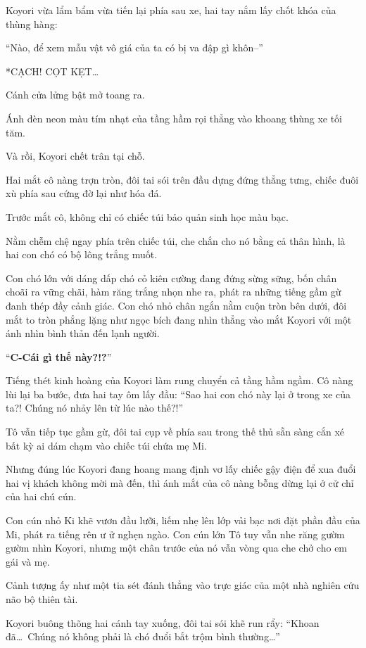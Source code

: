\documentclass[../main.tex]{subfiles}
\begin{document}
Koyori vừa lẩm bẩm vừa tiến lại phía sau xe, hai tay nắm lấy chốt khóa của thùng hàng:

``Nào, để xem mẫu vật vô giá của ta có bị va đập gì khôn--''

*CẠCH! CỌT KẸT\dots*

Cánh cửa lửng bật mở toang ra.

Ánh đèn neon màu tím nhạt của tầng hầm rọi thẳng vào khoang thùng xe tối tăm.

Và rồi, Koyori chết trân tại chỗ.

Hai mắt cô nàng trợn tròn, đôi tai sói trên đầu dựng đứng thẳng tưng, chiếc đuôi xù phía sau cứng đờ lại như hóa đá.

Trước mắt cô, không chỉ có chiếc túi bảo quản sinh học màu bạc.

Nằm chễm chệ ngay phía trên chiếc túi, che chắn cho nó bằng cả thân hình, là hai con chó có bộ lông trắng muốt.

Con chó lớn với dáng dấp chó cỏ kiên cường đang đứng sừng sững, bốn chân choãi ra vững chãi, hàm răng trắng nhọn nhe ra, phát ra những tiếng gầm gừ đanh thép đầy cảnh giác. Con chó nhỏ chân ngắn nằm cuộn tròn bên dưới, đôi mắt to tròn phẳng lặng như ngọc bích đang nhìn thẳng vào mắt Koyori với một ánh nhìn bình thản đến lạnh người.

``\textbf{C-Cái gì thế này?!?}''

Tiếng thét kinh hoàng của Koyori làm rung chuyển cả tầng hầm ngầm. Cô nàng lùi lại ba bước, đưa hai tay ôm lấy đầu: ``Sao hai con chó này lại ở trong xe của ta?! Chúng nó nhảy lên từ lúc nào thế?!''

Tô vẫn tiếp tục gầm gừ, đôi tai cụp về phía sau trong thế thủ sẵn sàng cắn xé bất kỳ ai dám chạm vào chiếc túi chứa mẹ Mi.

Nhưng đúng lúc Koyori đang hoang mang định vơ lấy chiếc gậy điện để xua đuổi hai vị khách không mời mà đến, thì ánh mắt của cô nàng bỗng dừng lại ở cử chỉ của hai chú cún.

Con cún nhỏ Ki khẽ vươn đầu lưỡi, liếm nhẹ lên lớp vải bạc nơi đặt phần đầu của Mi, phát ra tiếng rên ư ử nghẹn ngào. Con cún lớn Tô tuy vẫn nhe răng gườm gườm nhìn Koyori, nhưng một chân trước của nó vẫn vòng qua che chở cho em gái và mẹ.

Cảnh tượng ấy như một tia sét đánh thẳng vào trực giác của một nhà nghiên cứu não bộ thiên tài.

Koyori buông thõng hai cánh tay xuống, đôi tai sói khẽ run rẩy: ``Khoan đã\dots\ Chúng nó không phải là chó đuổi bắt trộm bình thường\dots''
\end{document}

